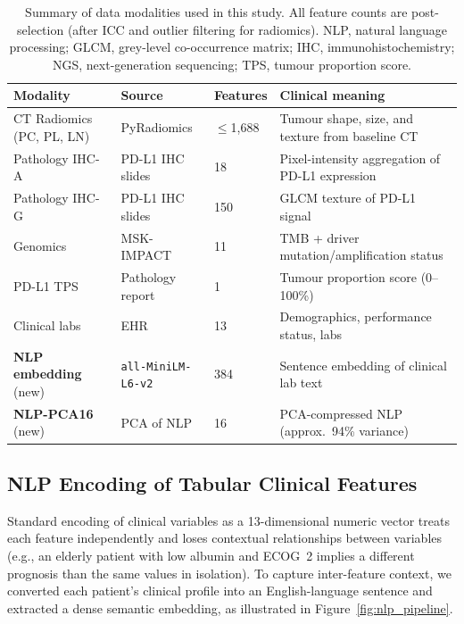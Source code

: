 \begin{table}[H]
\caption{Summary of data modalities used in this study.
  All feature counts are post-selection (after ICC and outlier filtering
  for radiomics).
  NLP, natural language processing; GLCM, grey-level co-occurrence matrix;
  IHC, immunohistochemistry; NGS, next-generation sequencing;
  TPS, tumour proportion score.}
\label{tab:modalities}
\small
\begin{tabular}{@{}p{2.3cm}p{2.7cm}p{1.2cm}p{4.1cm}@{}}
\toprule
\textbf{Modality} & \textbf{Source} & \textbf{Features} & \textbf{Clinical meaning} \\
\midrule
CT Radiomics (PC, PL, LN) & PyRadiomics & $\leq$1{,}688 & Tumour shape, size, and texture from baseline CT \\
Pathology IHC-A            & PD-L1 IHC slides & 18  & Pixel-intensity aggregation of PD-L1 expression \\
Pathology IHC-G            & PD-L1 IHC slides & 150 & GLCM texture of PD-L1 signal \\
Genomics                   & MSK-IMPACT & 11 & TMB + driver mutation/amplification status \\
PD-L1 TPS                  & Pathology report  & 1  & Tumour proportion score (0--100\%) \\
Clinical labs              & EHR               & 13 & Demographics, performance status, labs \\
\textbf{NLP embedding} (new) & \texttt{all-MiniLM-L6-v2} & 384 & Sentence embedding of clinical lab text \\
\textbf{NLP-PCA16} (new)   & PCA of NLP        & 16  & PCA-compressed NLP (approx.\ 94\% variance) \\
\bottomrule
\end{tabular}
\end{table}


\subsection{NLP Encoding of Tabular Clinical Features}
\label{sec:nlp}

Standard encoding of clinical variables as a 13-dimensional numeric vector
treats each feature independently and loses contextual relationships between
variables (e.g., an elderly patient with low albumin and ECOG~2 implies a
different prognosis than the same values in isolation).
To capture inter-feature context, we converted each patient's clinical
profile into an English-language sentence and extracted a dense semantic
embedding, as illustrated in Figure~\ref{fig:nlp_pipeline}.

